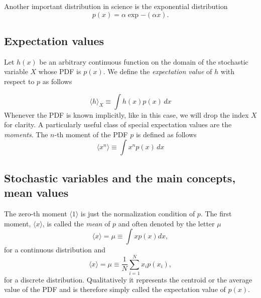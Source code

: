 \documentclass[%
oneside,                 %
final,                   %
10pt]{article}
\newenvironment{block_mdfboxadmon}[1][]{
\begin{block_mdfboxmdframed}[frametitle=#1]
}
{
\end{block_mdfboxmdframed}
}
\begin{document}
\begin{block_mdfboxadmon}[]
Another important distribution in science is the exponential distribution
\begin{equation*}
p(x) = \alpha\exp{-(\alpha x)}.
\end{equation*}
\end{block_mdfboxadmon} %



\subsection{Expectation values}

\begin{block_mdfboxadmon}[]
Let $h(x)$ be an arbitrary continuous function on the domain of the stochastic
variable $X$ whose PDF is $p(x)$. We define the \emph{expectation value}
of $h$ with respect to $p$ as follows

\begin{equation}
\langle h \rangle_X \equiv \int\! h(x)p(x)\,dx
\label{eq:expectation_value_of_h_wrt_p}
\end{equation}
Whenever the PDF is known implicitly, like in this case, we will drop
the index $X$ for clarity.  
A particularly useful class of special expectation values are the
\emph{moments}. The $n$-th moment of the PDF $p$ is defined as
follows
\begin{equation*}
\langle x^n \rangle \equiv \int\! x^n p(x)\,dx
\end{equation*}
\end{block_mdfboxadmon} %



\subsection{Stochastic variables and the main concepts, mean values}

\begin{block_mdfboxadmon}[]
The zero-th moment $\langle 1\rangle$ is just the normalization condition of
$p$. The first moment, $\langle x\rangle$, is called the \emph{mean} of $p$
and often denoted by the letter $\mu$
\begin{equation*}
\langle x\rangle  = \mu \equiv \int x p(x)dx,
\end{equation*}
for a continuous distribution and 
\begin{equation*}
\langle x\rangle  = \mu \equiv \frac{1}{N}\sum_{i=1}^N x_i p(x_i),
\end{equation*}
for a discrete distribution. 
Qualitatively it represents the centroid or the average value of the
PDF and is therefore simply called the expectation value of $p(x)$.
\end{block_mdfboxadmon} %
\end{document}
